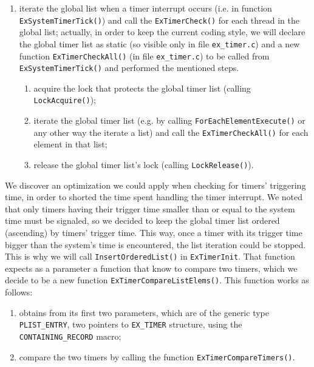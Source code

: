 \begin{enumerate}
        
    \item iterate the global list when a timer interrupt occurs (i.e. in function \lstinline|ExSystemTimerTick()|) and call the \lstinline|ExTimerCheck()| for each thread in the global list; actually, in order to keep the current coding style, we will declare the global timer list as static (so visible only in file \lstinline|ex_timer.c|) and a new function \lstinline|ExTimerCheckAll()| (in file \lstinline|ex_timer.c|) to be called from \lstinline|ExSystemTimerTick()| and performed the mentioned steps.
        \begin{enumerate}
            \item acquire the lock that protects the global timer list (calling \lstinline|LockAcquire()|);
            
            \item iterate the global timer list (e.g. by calling \lstinline|ForEachElementExecute()| or any other way the iterate a list) and call the \lstinline|ExTimerCheckAll()| for each element in that list;
            
            \item release the global timer list's lock (calling \lstinline|LockRelease()|).
        \end{enumerate}

\end{enumerate}

We discover an optimization we could apply when checking for timers' triggering time, in order to shorted the time spent handling the timer interrupt. We noted that only timers having their trigger time smaller than or equal to the system time must be signaled, so we decided to keep the global timer list ordered (ascending) by timers' trigger time. This way, once a timer with its trigger time bigger than the system's time is encountered, the list iteration could be stopped. This is why we will call \lstinline|InsertOrderedList()| in  \lstinline|ExTimerInit|. That function expects as a parameter a function that know to compare two timers, which we decide to be a new function \lstinline|ExTimerCompareListElems()|. This function works as follows:
\begin{enumerate}
    \item obtains from its first two parameters, which are of the generic type \lstinline|PLIST_ENTRY|, two pointers to \lstinline|EX_TIMER| structure, using the \lstinline|CONTAINING_RECORD| macro;
    
    \item compare the two timers by calling the function \lstinline|ExTimerCompareTimers()|.
\end{enumerate}

